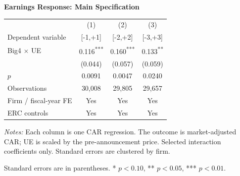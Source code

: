 \documentclass[10pt]{article}
\newcommand{\sym}[1]{\textsuperscript{#1}}
\begin{document}
\begin{minipage}{18.00cm}
\fontsize{10}{12}\selectfont
\setlength{\tabcolsep}{4pt}\renewcommand{\arraystretch}{1.08}
{\large\bfseries Earnings Response: Main Specification}\par\medskip
\begin{tabular*}{\linewidth}{@{\extracolsep{\fill}}lccc@{}}
\toprule
 & (1) & (2) & (3) \\
Dependent variable & [-1,+1] & [-2,+2] & [-3,+3] \\
\midrule
Big4 $\times$ UE & 0.116\sym{***} & 0.160\sym{***} & 0.133\sym{**} \\
 & (0.044) & (0.057) & (0.059) \\
$p$ & 0.0091 & 0.0047 & 0.0240 \\
\midrule
Observations & 30,008 & 29,805 & 29,657 \\
Firm / fiscal-year FE & Yes & Yes & Yes \\
ERC controls & Yes & Yes & Yes \\
\bottomrule\end{tabular*}\par\medskip
\fontsize{9}{11}\selectfont\textit{Notes:} Each column is one CAR regression. The outcome is market-adjusted CAR; UE is scaled by the pre-announcement price. Selected interaction coefficients only. Standard errors are clustered by firm.
\par Standard errors are in parentheses. * $p<0.10$, ** $p<0.05$, *** $p<0.01$.
\end{minipage}
\end{document}

